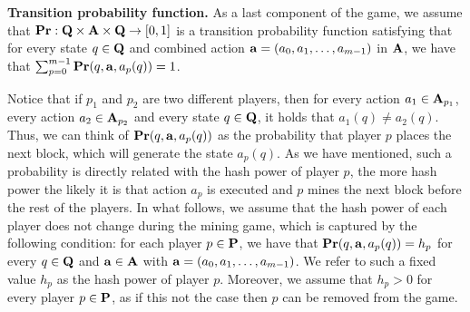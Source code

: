 \smallskip
\noindent
\textbf{Transition probability function.} %
As a last component of the game, we assume that $\mathbf{Pr} : \mathbf{Q} \times \mathbf{A} \times \mathbf{Q} \to [0,1]$ is a transition probability function satisfying that for every state $q \in \mathbf{Q}$ and combined action $\mathbf{a} = (a_0, a_1, \ldots, a_{m-1})$ in $\mathbf{A}$, we have that $\sum_{p=0}^{m-1} \mathbf{Pr}(q, \mathbf{a}, a_p(q)) = 1$.

Notice that if $p_1$ and $p_2$ are two different players, then for every action $a_1 \in \mathbf{A}_{p_1}$, every action $a_2 \in \mathbf{A}_{p_2}$ and every state $q \in \mathbf{Q}$, it holds that $a_1(q) \neq a_2(q)$. Thus, we can think of $\mathbf{Pr}(q, \mathbf{a}, a_p(q))$ as the probability that player $p$ places the next block, which will generate the state $a_p(q)$. As we have mentioned, such a probability is directly related with the hash power of player $p$, the more hash power the likely it is that action $a_p$ is executed and $p$ mines the next block before the rest of the players. In what follows, we assume that the hash power of each player does not change during the mining game, which is captured by the following condition:
for each player $p \in \mathbf{P}$, we 
have that $\mathbf{Pr}(q, \mathbf{a}, a_p(q)) = h_p$ for every $q \in \mathbf{Q}$ and $\mathbf{a} \in \mathbf{A}$ with $\mathbf{a} = (a_0, a_1, \ldots, a_{m-1})$. We refer to such a fixed value $h_p$ 
as the hash power of player $p$.
Moreover, we assume that $h_p > 0$ for every player $p \in \mathbf{P}$, as if this not the case then $p$ can be removed from the game.


